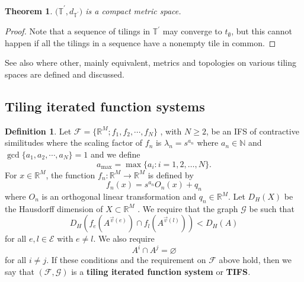 \documentclass{amsproc}
\newtheorem{theorem}{Theorem}
\theoremstyle{plain}
\theoremstyle{definition}
\newtheorem{definition}{Definition}
\numberwithin{equation}{section}
\begin{document}
\begin{theorem}
$\mathbb{(T}^{\prime},d_{\mathbb{T}^{\prime}})$ is a compact metric space.
\end{theorem}

\begin{proof}
Note that a sequence of tilings in $\mathbb{T}^{\prime}$ may converge to $%
t_{\emptyset}$, but this cannot happen if all the tilings in a sequence have
a nonempty tile in common.
\end{proof}

See also \cite{anderson, bedfordScene, sadun, solomyak, wicks} where other,
mainly equivalent, metrics and topologies on various tiling spaces are
defined and discussed.

\subsection{\label{TIFSsec}Tiling iterated function systems}

\begin{definition}
\label{defONE}Let $\mathcal{F}=\{{\mathbb{R}}^{M};f_{1},f_{2},\cdots,f_{N}\}$%
, with $N\geq2$, be an IFS of contractive similitudes where the scaling
factor of $f_{n}$ is $\lambda_{n}=s^{a_{n}}$ where $a_{n}\in\mathbb{N}$ and $%
\gcd\{a_{1},a_{2},\cdots,a_{N}\}=1$ and we define%
\begin{equation*}
a_{\max}=\max\{a_{i}:i=1,2,\dots,N\}.
\end{equation*}
For $x\in{\mathbb{R}}^{M}$, the function $f_{n}:\mathbb{R}^{M}\rightarrow 
\mathbb{R}^{M}$ is defined by 
\begin{equation*}
f_{n}(x)=s^{a_{n}}O_{n}(x)+q_{n}
\end{equation*}
where $O_{n}$ is an orthogonal linear transformation and $q_{n}\in{\mathbb{R}%
}^{M}$. Let $D_{H}(X)$ be the Hausdorff dimension of $X\subset\mathbb{R}^{M}$%
. We require that the graph $\mathcal{G}$ be such that 
\begin{equation}
D_{H}(f_{e}(A^{\overrightarrow{v}(e)})\cap f_{l}(A^{\overrightarrow{v}%
(l)}))<D_{H}(A)  \label{equation0}
\end{equation}
for all $e,l\in\mathcal{E}$ with $e\neq l$. We also require%
\begin{equation}
A^{i}\cap A^{j}=\varnothing  \label{equation01}
\end{equation}
for all $i\neq j$. If these conditions and the requirement on $\mathcal{F}$
above hold, then we say that $\left( \mathcal{F},\mathcal{G}\right) $ is a 
\textbf{tiling iterated function system} or \textbf{TIFS}\textit{.}
\end{definition}
\end{document}
